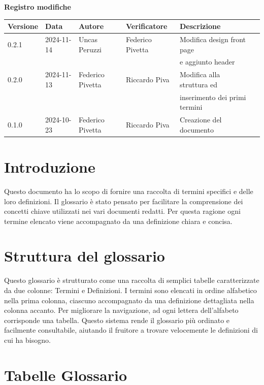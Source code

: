 \documentclass[10pt]{article}
\begin{document}
\centering\textbf{Registro modifiche}\\
\vspace{2mm}
\begin{tabular}{|l|l|l|l|l|l|}
\hline
\textbf{Versione} & \textbf{Data} & \textbf{Autore} & \textbf{Verificatore} & \textbf{Descrizione}\\
\hline
0.2.1 & 2024-11-14  & Uncas Peruzzi & Federico Pivetta  & Modifica design front page\\ & & & & e aggiunto header \\
\hline
0.2.0 & 2024-11-13  & Federico Pivetta & Riccardo Piva  & Modifica alla struttura ed\\
& & & & inserimento dei primi termini\\
\hline
0.1.0 & 2024-10-23  & Federico Pivetta & Riccardo Piva  & Creazione del documento\\
\hline

\end{tabular}
\newpage
\raggedright
\tableofcontents
\newpage

\section{Introduzione}
Questo documento ha lo scopo di fornire una raccolta di termini specifici e delle loro definizioni. Il glossario è stato pensato per facilitare la comprensione dei concetti chiave utilizzati nei vari documenti redatti. Per questa ragione ogni termine elencato viene accompagnato da una definizione chiara e concisa.\\

\section{Struttura del glossario}
Questo glossario è strutturato come una raccolta di semplici tabelle caratterizzate da due colonne: Termini e Definizioni. I termini sono elencati in ordine alfabetico nella prima colonna, ciascuno accompagnato da una definizione dettagliata nella colonna accanto. \newline
Per migliorare la navigazione, ad ogni lettera dell'alfabeto corrisponde una tabella. Questo sistema rende il glossario più ordinato e facilmente consultabile, aiutando il fruitore a trovare velocemente le definizioni di cui ha bisogno.\\

\newpage
\section{Tabelle Glossario}
\end{document}
